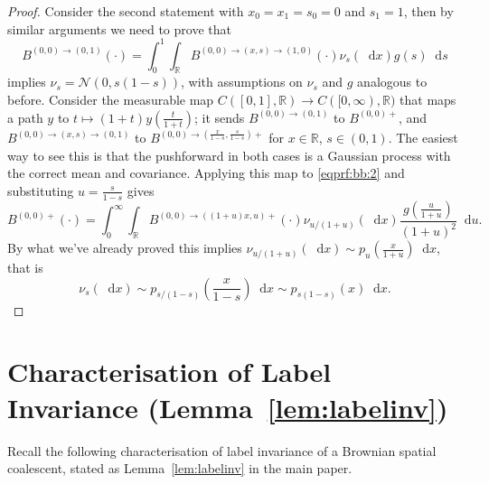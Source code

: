 \documentclass[reqno,draft]{amsart}
\numberwithin{equation}{section}
\theoremstyle{plain}
\theoremstyle{remark}
\newcommand{\R}{\mathbb{R}} %
\newcommand*\diff{\mathop{}\!\mathrm{d}}
\begin{document}
\begin{proof}
    Consider the second statement with $x_0=x_1=s_0=0$ and $s_1 = 1$, then by similar arguments we need to prove that 
    \begin{equation}\label{eqprf:bb:2}
        B^{(0,0) \to (0,1)}(\cdot ) = \int_0^1 \int_\R B^{(0,0) \to (x,s)\to (1,0)}(\cdot ) \nu_s(\diff x) g(s)\diff s
    \end{equation}
    implies $\nu_s = \mathcal{N}(0, s(1-s))$, with assumptions on $\nu_s$ and $g$ analogous to before. Consider the measurable map $C([0,1],\R) \to C([0,\infty),\R)$ that maps a path $y$ to $t \mapsto (1+t) y(\frac{t}{1+t})$; it sends $B^{(0,0)\to (0,1)}$ to $B^{(0,0)+}$, and $B^{(0,0) \to (x,s) \to (0,1)}$ to $B^{(0,0) \to (\frac{x}{1-s}, \frac{s}{1-s})+}$ for $x\in\R$, $s\in (0,1)$. The easiest way to see this is that the pushforward in both cases is a Gaussian process with the correct mean and covariance. Applying this map to \cref{eqprf:bb:2} and substituting $u = \frac{s}{1-s}$ gives \[
        B^{(0,0)+}(\cdot ) = \int_0^\infty \int_\R B^{(0,0) \to ((1+u)x,u)+}(\cdot ) \nu_{u / (1+u)}(\diff x) \frac{g(\frac{u}{1+u})}{(1+u)^2}\diff u.
    \] By what we've already proved this implies $\nu_{u / (1+u)}(\diff x) \sim p_u(\frac{x}{1+u})\diff x$, that is \[
    \nu_s(\diff x) \sim p_{s / (1-s)}(\frac{x}{1-s}) \diff x \sim p_{s(1-s)}(x)\diff x.
    \] 
\end{proof}

\section{Characterisation of Label Invariance (Lemma~\ref{lem:labelinv})}\label{sec:prooflabelinv}

Recall the following characterisation of label invariance of a Brownian spatial coalescent, stated as Lemma~\ref{lem:labelinv} in the main paper.
\end{document}
